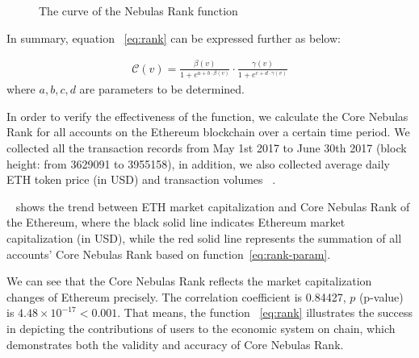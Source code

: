 \begin{figure}
\centering
{}
\caption{The curve of the Nebulas Rank function \label{fig-nr}}
\end{figure}


\vspace{2em}
In summary, equation ~\ref{eq:rank} can be expressed further as below:

\begin{align}
\label{eq:rank-param}
\mathcal{C}(v) =  \frac{\beta(v)}{1+e^{a + b \cdot \beta(v)}} \cdot \frac{\gamma(v)}{1+e^{c + d \cdot \gamma(v)}}
\end{align}
\noindent where $a, b, c, d$ are parameters to be determined.


In order to verify the effectiveness of the function, we calculate the Core Nebulas Rank for all accounts on the Ethereum blockchain over a certain time period. We collected all the transaction records from May 1st 2017 to June 30th 2017 (block height: from 3629091 to 3955158), in addition, we also collected average daily ETH token price (in USD) and transaction volumes ~\cite{coinmarketcap}.

~ shows the trend between ETH market capitalization and Core Nebulas Rank of the Ethereum, where the black solid line indicates Ethereum market capitalization (in USD), while the red solid line represents the summation of all accounts' Core Nebulas Rank based on function~\ref{eq:rank-param}.

We can see that the Core Nebulas Rank reflects the market capitalization changes of Ethereum precisely. The correlation coefficient is 0.84427, $p$ (p-value) is $4.48\times{}10^{-17}<0.001$. That means, the function ~\ref{eq:rank} illustrates the success in depicting the contributions of users to the economic system on chain, which demonstrates both the validity and accuracy of Core Nebulas Rank. 


